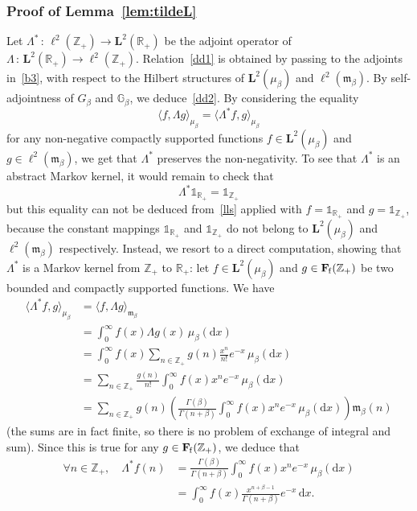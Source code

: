 \documentclass[10pt]{amsart}
\theoremstyle{definition}\newtheorem{defi}[theo]{Definition}\newtheorem{rema}[theo]{Remark}\newtheorem{exam}[theo]{Example}\newtheorem{exem}[theo]{Example}\newtheorem{nota}[theo]{Notation}
\newcommand{\RR}{\mathbb{R}}
\newcommand{\ZZ}{\mathbb{Z}}
\newcommand{\fm}{\mathfrak{m}}
\newcommand{\iy}{\infty}
\newcommand{\lt}{\left}
\newcommand{\ri}{\rightarrow}
\newcommand{\rt}{\right}
\newcommand{\st}{\,:\,}
\newcommand{\un}{\mathds{1}}
\newcommand{\dBg}{{\discret{G}}}
\newcommand{\Bg}{G}
\newcommand{\esL}{\mathbf{L}}
\newcommand{\esLd}{\ell}
\newcommand{\esF}{\mathbf{F}}
\newcommand{\esFf}{\esF_{\hskip-.3mm\mathrm{f}}}
\newcommand{\discret}[1]{\mathds{#1}}
\newcommand{\adjL}{\Lambda^*}
\let\oldforall\forall
\renewcommand*{\forall}{\mathrel{\oldforall}}
\newcommand*{\dd}{\mathrm{d}}
\newcommand*{\dx}{\dd x}
\begin{document}
\subsubsection{Proof of Lemma~\ref{lem:tildeL}} Let $\adjL\st \esLd^2(\ZZ_+)\ri\esL^2(\RR_+)$ be the adjoint operator of $\Lambda\st \esL^2(\RR_+)\ri\esLd^2(\ZZ_+)$. Relation~\eqref{dd1} is obtained by passing to the adjoints in~\eqref{b3}, with respect to the Hilbert structures of $\esL^2(\mu_{\beta})$ and $\esLd^2(\fm_{\beta})$. By self-adjointness of $\Bg_{\beta}$ and $\dBg_{\beta}$, we deduce~\eqref{dd2}. By considering the equality
\begin{equation}\label{lls}
\langle f,\Lambda g\rangle_{\mu_{\beta}}=\langle \adjL f, g\rangle_{\mu_{\beta}}
\end{equation}
for any non-negative compactly supported functions $f\in\esL^2(\mu_{\beta})$ and $g\in\esLd^2(\fm_{\beta})$, we get that $\adjL$ preserves the non-negativity. To see that $\adjL$ is an abstract Markov kernel, it would remain to check that
\[
\adjL \un_{\RR_+}=\un_{\ZZ_+}
\]
but this equality can not be deduced from~\eqref{lls} applied with $f=\un_{\RR_+}$ and $g=\un_{\ZZ_+}$, because the constant mappings $\un_{\RR_+}$ and $\un_{\ZZ_+}$ do not belong to $\esL^2(\mu_{\beta})$ and $\esLd^2(\fm_{\beta})$ respectively. Instead, we resort to a direct computation, showing that $\adjL $ is a Markov kernel from $\ZZ_+$ to $\RR_+$: let $f\in\esL^2(\mu_{\beta})$ and $g\in \esFf(\ZZ_+)$ be two bounded and compactly supported functions. We have
\begin{align*}
\langle \adjL f, g\rangle_{\mu_{\beta}}&=\langle f,\Lambda g\rangle_{\fm_{\beta}}\phantom{\int_0}\\
&=\int_0^{\iy } f(x)\Lambda g(x)\, \mu_{\beta}(\dx)\\
&=\int_0^{\iy } f(x)\sum_{n\in\ZZ_+}g(n)\frac{x^n}{n!}e^{-x}\, \mu_{\beta}(\dx)\\
&=\sum_{n\in\ZZ_+}\frac{g(n)}{n!}\int_0^{\iy } f(x)x^ne^{-x}\, \mu_{\beta}(\dx)\\
&=\sum_{n\in\ZZ_+}g(n)\lt(\frac{\Gamma(\beta)}{\Gamma(n+\beta)}\int_0^{\iy } f(x)x^ne^{-x}\, \mu_{\beta}(\dx)\rt)\fm_{\beta}(n)
\end{align*}
(the sums are in fact finite, so there is no problem of exchange of integral and sum). Since this is true for any $g\in \esFf(\ZZ_+)$, we deduce that
\begin{align*}
\forall n\in\ZZ_+,\quad
\adjL f(n)&=\frac{\Gamma(\beta)}{\Gamma(n+\beta)}\int_0^{\iy } f(x)x^ne^{-x}\, \mu_{\beta}(\dx)\\
&=\int_0^{\iy } f(x)\frac{x^{n+\beta-1}}{\Gamma(n+\beta)}e^{-x}\,\dx.
\end{align*}
\end{document}
